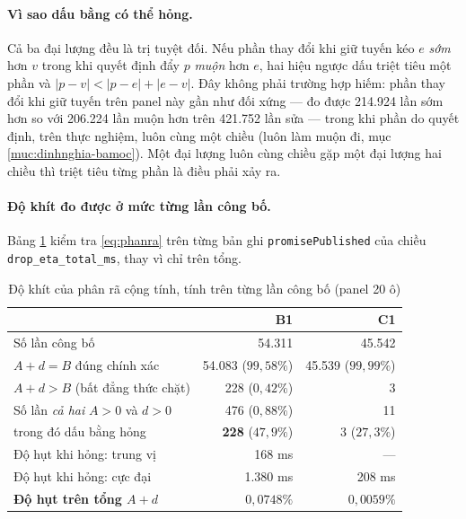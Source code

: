 \paragraph{Vì sao dấu bằng có thể hỏng.} Cả ba đại lượng đều là trị tuyệt đối. Nếu phần thay đổi
khi giữ tuyến kéo $e$ \emph{sớm} hơn $v$ trong khi quyết định đẩy $p$ \emph{muộn} hơn $e$, hai hiệu
ngược dấu triệt tiêu một phần và $|p-v| < |p-e| + |e-v|$. Đây không phải trường hợp hiếm: phần
thay đổi khi giữ tuyến trên panel này gần như đối xứng --- đo được 214.924 lần sớm hơn so với 206.224 lần muộn
hơn trên 421.752 lần sửa --- trong khi phần do quyết định, trên thực nghiệm, luôn cùng một chiều
(luôn làm muộn đi, mục \ref{muc:dinhnghia-bamoc}). Một đại lượng luôn cùng chiều gặp một đại lượng hai chiều thì
triệt tiêu từng phần là điều phải xảy ra.

\paragraph{Độ khít đo được ở mức từng lần công bố.} Bảng \ref{bang:khit-tung-lan} kiểm tra
\eqref{eq:phanra} trên từng bản ghi \texttt{promisePublished} của chiều
\texttt{drop\_eta\_total\_ms}, thay vì chỉ trên tổng.

\begin{table}[htbp]
\centering
\caption{Độ khít của phân rã cộng tính, tính trên từng lần công bố (panel 20 ô)}
\label{bang:khit-tung-lan}
\small
\begin{tabular}{@{}lrr@{}}
\toprule
& \textbf{B1} & \textbf{C1}\\
\midrule
Số lần công bố & 54.311 & 45.542\\
$A + d = B$ đúng chính xác & 54.083 \;($99{,}58\%$) & 45.539 \;($99{,}99\%$)\\
$A + d > B$ (bất đẳng thức chặt) & 228 \;($0{,}42\%$) & 3\\
\midrule
Số lần \emph{cả hai} $A>0$ và $d>0$ & 476 \;($0{,}88\%$) & 11\\
\quad trong đó dấu bằng hỏng & \textbf{228} \;(\textbf{$47{,}9\%$}) & 3 \;($27{,}3\%$)\\
\midrule
Độ hụt khi hỏng: trung vị & 168 ms & ---\\
Độ hụt khi hỏng: cực đại & 1.380 ms & 208 ms\\
\textbf{Độ hụt trên tổng $A+d$} & \textbf{$0{,}0748\%$} & \textbf{$0{,}0059\%$}\\
\bottomrule
\end{tabular}
\end{table}

